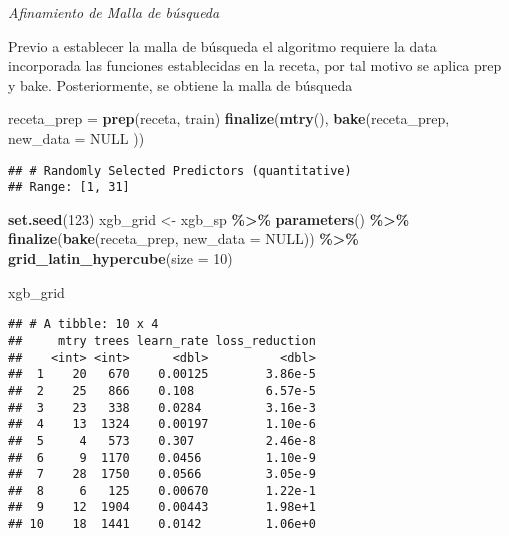 \documentclass[
]{article}
\newenvironment{Shaded}{\begin{snugshade}}{\end{snugshade}}
\newcommand{\AttributeTok}[1]{\textcolor[rgb]{0.13,0.29,0.53}{#1}}
\newcommand{\ConstantTok}[1]{\textcolor[rgb]{0.56,0.35,0.01}{#1}}
\newcommand{\DecValTok}[1]{\textcolor[rgb]{0.00,0.00,0.81}{#1}}
\newcommand{\FunctionTok}[1]{\textcolor[rgb]{0.13,0.29,0.53}{\textbf{#1}}}
\newcommand{\NormalTok}[1]{#1}
\newcommand{\OtherTok}[1]{\textcolor[rgb]{0.56,0.35,0.01}{#1}}
\newcommand{\SpecialCharTok}[1]{\textcolor[rgb]{0.81,0.36,0.00}{\textbf{#1}}}
\begin{document}
\emph{Afinamiento de Malla de búsqueda}

Previo a establecer la malla de búsqueda el algoritmo requiere la data
incorporada las funciones establecidas en la receta, por tal motivo se
aplica prep y bake. Posteriormente, se obtiene la malla de búsqueda

\begin{Shaded}
\begin{Highlighting}[]
\NormalTok{receta\_prep }\OtherTok{=} \FunctionTok{prep}\NormalTok{(receta, train)}
\FunctionTok{finalize}\NormalTok{(}\FunctionTok{mtry}\NormalTok{(), }\FunctionTok{bake}\NormalTok{(receta\_prep, }\AttributeTok{new\_data =} \ConstantTok{NULL}\NormalTok{ ))}
\end{Highlighting}
\end{Shaded}

\begin{verbatim}
## # Randomly Selected Predictors (quantitative)
## Range: [1, 31]
\end{verbatim}

\begin{Shaded}
\begin{Highlighting}[]
\FunctionTok{set.seed}\NormalTok{(}\DecValTok{123}\NormalTok{)}
\NormalTok{xgb\_grid }\OtherTok{\textless{}{-}}\NormalTok{ xgb\_sp }\SpecialCharTok{\%\textgreater{}\%}
  \FunctionTok{parameters}\NormalTok{() }\SpecialCharTok{\%\textgreater{}\%}
  \FunctionTok{finalize}\NormalTok{(}\FunctionTok{bake}\NormalTok{(receta\_prep, }\AttributeTok{new\_data =} \ConstantTok{NULL}\NormalTok{)) }\SpecialCharTok{\%\textgreater{}\%}
  \FunctionTok{grid\_latin\_hypercube}\NormalTok{(}\AttributeTok{size =} \DecValTok{10}\NormalTok{)}

\NormalTok{xgb\_grid}
\end{Highlighting}
\end{Shaded}

\begin{verbatim}
## # A tibble: 10 x 4
##     mtry trees learn_rate loss_reduction
##    <int> <int>      <dbl>          <dbl>
##  1    20   670    0.00125        3.86e-5
##  2    25   866    0.108          6.57e-5
##  3    23   338    0.0284         3.16e-3
##  4    13  1324    0.00197        1.10e-6
##  5     4   573    0.307          2.46e-8
##  6     9  1170    0.0456         1.10e-9
##  7    28  1750    0.0566         3.05e-9
##  8     6   125    0.00670        1.22e-1
##  9    12  1904    0.00443        1.98e+1
## 10    18  1441    0.0142         1.06e+0
\end{verbatim}
\end{document}
